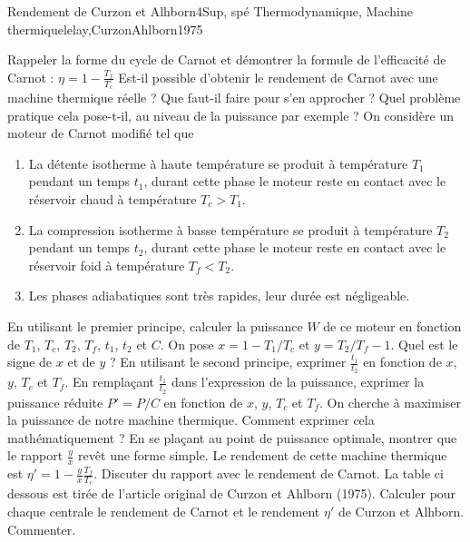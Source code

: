 \begin{exercise}{Rendement de Curzon et Alhborn}{4}{Sup, spé}
{Thermodynamique, Machine thermique}{lelay,CurzonAhlborn1975}

\begin{questions}
    \questioncours Rappeler la forme du cycle de Carnot et démontrer la formule de l'efficacité de Carnot : $\eta = 1 -\frac{T_f}{T_c}$
    \question Est-il possible d'obtenir le rendement de Carnot avec une machine thermique réelle ? Que faut-il faire pour s'en approcher ? Quel problème pratique cela pose-t-il, au niveau de la puissance par exemple ?
    \question On considère un moteur de Carnot modifié tel que 
    \begin{enumerate}
        \item La détente isotherme à haute température se produit à température $T_1$ pendant un temps $t_1$, durant cette phase le moteur reste en contact avec le réservoir chaud à température $T_c > T_1$.
        \item La compression isotherme à basse température se produit à température $T_2$ pendant un temps $t_2$, durant cette phase le moteur reste en contact avec le réservoir foid à température $T_f < T_2$.
        \item Les phases adiabatiques sont très rapides, leur durée est négligeable.
    \end{enumerate}
    En utilisant le premier principe, calculer la puissance $W$ de ce moteur en fonction de $T_1$, $T_c$, $T_2$, $T_f$, $t_1$, $t_2$ et $C$.
    \question On pose $x = 1 - T_1/T_c$ et $y = T_2/T_f-1$. Quel est le signe de $x$ et de $y$ ? En utilisant le second principe, exprimer $\frac{t_1}{t_2}$ en fonction de $x$, $y$, $T_c$ et $T_f$.
    \question En remplaçant $\frac{t_1}{t_2}$ dans l'expression de la puissance, exprimer la puissance réduite $P' = P/C$ en fonction de $x$, $y$, $T_c$ et $T_f$.
    \question On cherche à maximiser la puissance de notre machine thermique. Comment exprimer cela mathématiquement ? 
    \question En se plaçant au point de puissance optimale, montrer que le rapport $\frac{y}{x}$ revêt une forme simple.
    \question Le rendement de cette machine thermique est $\eta' = 1-\frac{y}{x}\frac{T_f}{T_c}$. Discuter du rapport avec le rendement de Carnot.
    \question La table ci dessous est tirée de l'article original de Curzon et Ahlborn (1975). Calculer pour chaque centrale le rendement de Carnot et le rendement $\eta'$ de Curzon et Alhborn. Commenter.
\end{questions}


\end{exercise}
